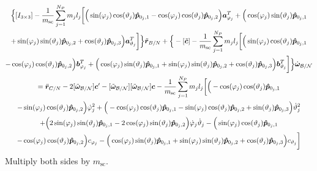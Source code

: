 \begin{multline}
	\Big\{[I_{3\times3}] -\frac{1}{m_{\text{sc}}}\sum_{j=1}^{N_{P}}m_j l_j \bigg[
	\Big(\sin(\varphi_j)\cos(\vartheta_j)\bm{\hat{p}}_{0_j,1}-\cos(\varphi_j)\cos(\vartheta_j)\bm{\hat{p}}_{0_j,2}\Big)\bm a_{\varphi_j}^T +\Big(\cos(\varphi_j)\sin(\vartheta_j)\bm{\hat{p}}_{0_j,1}\\+\sin(\varphi_j)\sin(\vartheta_j)\bm{\hat{p}}_{0_j,2}+\cos(\vartheta_j)\bm{\hat{p}}_{0_j,3}\Big)\bm a_{\vartheta_j}^T \bigg]\Big\}\ddot{\bm r}_{B/N}
	+\Big\{-[\tilde{\bm{c}}] -\frac{1}{m_{\text{sc}}}\sum_{j=1}^{N_{P}}m_j l_j \bigg[
	\Big(\sin(\varphi_j)\cos(\vartheta_j)\bm{\hat{p}}_{0_j,1}\\-\cos(\varphi_j)\cos(\vartheta_j)\bm{\hat{p}}_{0_j,2}\Big)\bm b_{\varphi_j}^T +\Big(\cos(\varphi_j)\sin(\vartheta_j)\bm{\hat{p}}_{0_j,1}+\sin(\varphi_j)\sin(\vartheta_j)\bm{\hat{p}}_{0_j,2}+\cos(\vartheta_j)\bm{\hat{p}}_{0_j,3}\Big)\bm b_{\vartheta_j}^T \bigg] \Big\}\dot{\bm\omega}_{\cal B/N}
	\\= \ddot{\bm r}_{C/N} 	- 2[\tilde{\bm\omega}_{\cal B/N}] \bm c'
	-[\tilde{\bm\omega}_{\cal B/N}][\tilde{\bm\omega}_{\cal B/N}]\bm{c}
	-\frac{1}{m_{\text{sc}}}\sum_{j=1}^{N_{P}}m_j l_j \bigg[
	\Big(-\cos(\varphi_j)\cos(\vartheta_j)\bm{\hat{p}}_{0_j,1}\\-\sin(\varphi_j)\cos(\vartheta_j)\bm{\hat{p}}_{0_j,2}\Big)\dot{\varphi}_j^2
	+\Big(-\cos(\varphi_j)\cos(\vartheta_j)\bm{\hat{p}}_{0_j,1}-\sin(\varphi_j)\cos(\vartheta_j)\bm{\hat{p}}_{0_j,2}+\sin(\vartheta_j)\bm{\hat{p}}_{0_j,3} \Big)\dot{\vartheta}_j^2 \\+
	\Big(2\sin(\varphi_j)\sin(\vartheta_j)\bm{\hat{p}}_{0_j,1} -2\cos(\varphi_j)\sin(\vartheta_j)\bm{\hat{p}}_{0_j,2}\Big)\dot{\varphi}_j\dot{\vartheta}_j
	-\Big(\sin(\varphi_j)\cos(\vartheta_j)\bm{\hat{p}}_{0_j,1}\\-\cos(\varphi_j)\cos(\vartheta_j)\bm{\hat{p}}_{0_j,2}\Big)c_{\varphi_j} - \Big(\cos(\varphi_j)\sin(\vartheta_j)\bm{\hat{p}}_{0_j,1}+\sin(\varphi_j)\sin(\vartheta_j)\bm{\hat{p}}_{0_j,2}+\cos(\vartheta_j)\bm{\hat{p}}_{0_j,3}\Big) c_{\vartheta_j}
	\bigg]
	\label{eq:Rbddot6}
\end{multline}
Multiply both sides by $m_{\text{sc}}$.

